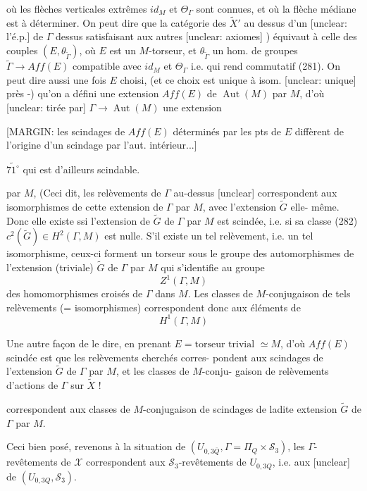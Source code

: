 où les flèches verticales extrêmes $id_M$
et $\Theta_\Gamma$ sont connues, et où la flèche médiane
est à déterminer. On peut dire
que la catégorie des $\tilde{X}'$ au dessus
d'un [unclear: l'é.p.] de $\Gamma$ dessus satisfaisant
aux autres [unclear: axiomes] ) équivaut
à celle des couples $(E, \theta_{\tilde{\Gamma}})$, où $E$
est un $M$-torseur, et $\theta_{\tilde{\Gamma}}$ un
hom. de groupes $\tilde{\Gamma} \to Aff(E)$
compatible avec $id_M$ et $\Theta_\Gamma$ i.e. qui
rend commutatif (281). On
peut dire aussi une fois $E$ choisi,
(et ce choix est unique à isom. [unclear: unique] près -)
qu'on a défini une extension
$Aff(E)$ de $\operatorname{Aut}(M)$ par $M$, d'où
[unclear: tirée par] $\Gamma \to \operatorname{Aut}(M)$ une extension

\newpage


[MARGIN: les scindages de $Aff(E)$ déterminés par les pts de $E$ diffèrent de l'origine d'un scindage par l'aut. intérieur...]

$\widetilde{71^\circ}$ qui est d'ailleurs scindable.

par $M$, (Ceci dit, les relèvements
de $\Gamma$ au-dessus [unclear] correspondent aux
isomorphismes de cette extension
de $\Gamma$ par $M$, avec l'extension $\widetilde{G}$ elle-
même. Donc elle existe ssi l'extension de
$\widetilde{G}$ de $\Gamma$ par $M$ est scindée, i.e. si sa classe
(282) $c^2(\widetilde{G}) \in H^2(\Gamma, M)$ est nulle.
S'il existe un tel relèvement, i.e. un tel
isomorphisme, ceux-ci forment un torseur
sous le groupe des automorphismes de
l'extension (triviale) $\widetilde{G}$ de $\Gamma$ par $M$
qui s'identifie au groupe
$$Z^1(\Gamma, M)$$
des homomorphismes croisés de $\Gamma$ dans $M$.
Les classes de $M$-conjugaison de
tels relèvements (= isomorphismes)
correspondent donc aux éléments de
$$H^1(\Gamma, M)$$

Une autre façon de le dire, en prenant
$E = \text{torseur trivial } \simeq M$, d'où $Aff(E)$ scindée
est que les relèvements cherchés corres-
pondent aux scindages de l'extension
$\widetilde{G}$ de $\Gamma$ par $M$, et les classes de $M$-conju-
gaison de relèvements d'actions de $\Gamma$ sur $\widetilde{X}$ !

\newpage


correspondent aux classes de $M$-conjugaison de scindages de ladite extension $\tilde{G}$ de $\Gamma$ par $M$.

Ceci bien posé, revenons à la situation de $(U_{0,3 \overline{Q}}, \Gamma = \Pi_Q \times \mathcal{S}_3)$, les $\Gamma$-revêtements de $\mathcal{X}$ correspondent aux $\mathcal{S}_3$-revêtements de $U_{0,3 Q}$, i.e. aux [unclear] de $(U_{0,3 Q}, \mathcal{S}_3)$. 

